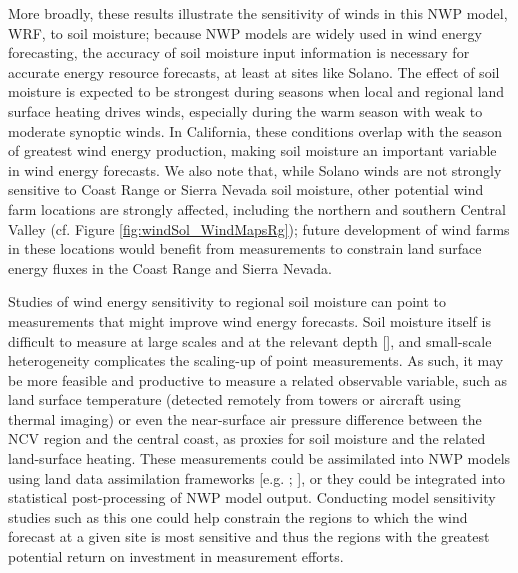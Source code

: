 More broadly, these results illustrate the sensitivity of winds in this NWP model, WRF, to soil moisture; because NWP models are widely used in wind energy forecasting, the accuracy of soil moisture input information is necessary for accurate energy resource forecasts, at least at sites like Solano.  The effect of soil moisture is expected to be strongest during seasons when local and regional land surface heating drives winds, especially during the warm season with weak to moderate synoptic winds.  In California, these conditions overlap with the season of greatest wind energy production, making soil moisture an important variable in wind energy forecasts.  We also note that, while Solano winds are not strongly sensitive to Coast Range or Sierra Nevada soil moisture, other potential wind farm locations are strongly affected, including the northern and southern Central Valley (cf. Figure \ref{fig:windSol_WindMapsRg}); future development of wind farms in these locations would benefit from measurements to constrain land surface energy fluxes in the Coast Range and Sierra Nevada.

Studies of wind energy sensitivity to regional soil moisture can point to measurements that might improve wind energy forecasts.  Soil moisture itself is difficult to measure at large scales and at the relevant depth [\cite{seneviratne2010investigating}], and small-scale heterogeneity complicates the scaling-up of point measurements.  As such, it may be more feasible and productive to measure a related observable variable, such as land surface temperature (detected remotely from towers or aircraft using thermal imaging) or even the near-surface air pressure difference between the NCV region and the central coast, as proxies for soil moisture and the related land-surface heating.  These measurements could be assimilated into NWP models using land data assimilation frameworks [e.g. \cite{rodell2004global}; \cite{drusch2007initializing}], or they could be integrated into statistical post-processing of NWP model output.  Conducting model sensitivity studies such as this one could help constrain the regions to which the wind forecast at a given site is most sensitive and thus the regions with the greatest potential return on investment in measurement efforts.

